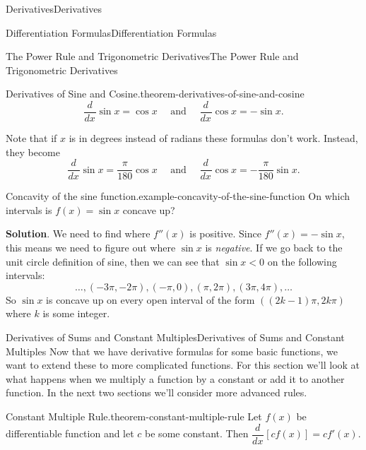 \documentclass[10pt,]{book}
\numberwithin{equation}{section}
\newcommand{\dv}[3][]{\dfrac{d^{#1} #2}{d #3^{#1}}}
\begin{document}
\begin{chapterptx}{Derivatives}{}{Derivatives}{}{}
\begin{sectionptx}{Differentiation Formulas}{}{Differentiation Formulas}{}{}
\begin{subsectionptx}{The Power Rule and Trigonometric Derivatives}{}{The Power Rule and Trigonometric Derivatives}{}{}
\begin{theorem}{Derivatives of Sine and Cosine.}{}{theorem-derivatives-of-sine-and-cosine}
\begin{equation*}
\dv{}{x}\sin x = \cos x\quad\text{ and }\quad\dv{}{x}\cos x = -\sin x.
\end{equation*}
%
\end{theorem}
\hypertarget{p-131}{}%
Note that if \(x\) is in degrees instead of radians these formulas don't work. Instead, they become%
\begin{equation*}
\dv{}{x}\sin x = \frac{\pi}{180}\cos x\quad\text{ and }\quad\dv{}{x}\cos x = -\frac{\pi}{180}\sin x.
\end{equation*}
%
\begin{example}{Concavity of the sine function.}{example-concavity-of-the-sine-function}%
\hypertarget{p-132}{}%
On which intervals is \(f(x) = \sin x\) concave up?%
\par\smallskip%
\noindent\textbf{Solution}.\hypertarget{solution-27}{}\quad%
\hypertarget{p-133}{}%
We need to find where \(f''(x)\) is positive. Since \(f''(x) = -\sin x\), this means we need to figure out where \(\sin x\) is \emph{negative}. If we go back to the unit circle definition of sine, then we can see that \(\sin x < 0\) on the following intervals:%
\begin{equation*}
\ldots, (-3\pi,-2\pi), (-\pi,0),(\pi,2\pi), (3\pi,4\pi),\ldots
\end{equation*}
So \(\sin x\) is concave up on every open interval of the form \(((2k-1)\pi, 2k\pi)\) where \(k\) is some integer.%
\end{example}
\end{subsectionptx}
%
%
\typeout{************************************************}
\typeout{************************************************}
%
\begin{subsectionptx}{Derivatives of Sums and Constant Multiples}{}{Derivatives of Sums and Constant Multiples}{}{}\label{subsection-derivatives-of-sums-and-constant-multiples}
\hypertarget{p-134}{}%
Now that we have derivative formulas for some basic functions, we want to extend these to more complicated functions. For this section we'll look at what happens when we multiply a function by a constant or add it to another function. In the next two sections we'll consider more advanced rules.%
\begin{theorem}{Constant Multiple Rule.}{}{theorem-constant-multiple-rule}%
\hypertarget{p-135}{}%
Let \(f(x)\) be differentiable function and let \(c\) be some constant. Then \(\dv{}{x}[cf(x)] = cf'(x)\).%
\end{theorem}

\end{subsectionptx}
\end{sectionptx}
\end{chapterptx}
\end{document}
